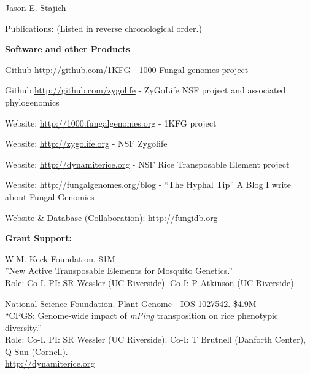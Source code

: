 \documentclass[10pt]{article}
\begin{document}
\begin{cv}{\centerline{Jason E. Stajich}}
\begin{cvlist}{Publications: (Listed in reverse chronological order.)}
\begin{cvlistcompact}{\bf Software and other Products}
 \item Github \url{http://github.com/1KFG} - 1000 Fungal
   genomes project
\item Github \url{http://github.com/zygolife} - ZyGoLife NSF project
  and associated phylogenomics
\item Website: \url{http://1000.fungalgenomes.org} - 1KFG project
\item Website: \url{http://zygolife.org} - NSF Zygolife
\item Website: \url{http://dynamiterice.org} - NSF Rice Transposable
    Element project
\item Website: \url{http://fungalgenomes.org/blog} - ``The Hyphal
  Tip'' A Blog I write about Fungal Genomics
\item Website \& Database (Collaboration): \url{http://fungidb.org}
\end{cvlistcompact}


\end{cvlist}
\setlength{\cvlabelwidth}{24mm}


\begin{cvlistcompact}{\bf Grant Support:}
\item [{\bf Ongoing support}]

\item [2011-2016] W.M. Keck Foundation. \$1M \\
''New Active Transposable Elements for Mosquito Genetics.'' \\
Role: Co-I. PI: SR Wessler (UC Riverside). Co-I: P Atkinson (UC Riverside). 

\item [2011-2017] National Science Foundation. Plant Genome -
  IOS-1027542. \$4.9M  \\
  ``CPGS: Genome-wide impact of \textit{mPing} transposition on rice phenotypic diversity.'' \\
Role: Co-I. PI: SR Wessler (UC Riverside). Co-I: T Brutnell (Danforth
Center), Q Sun (Cornell). \\
\url{http://dynamiterice.org}


\end{cvlistcompact}
\end{cv}
\end{document}
